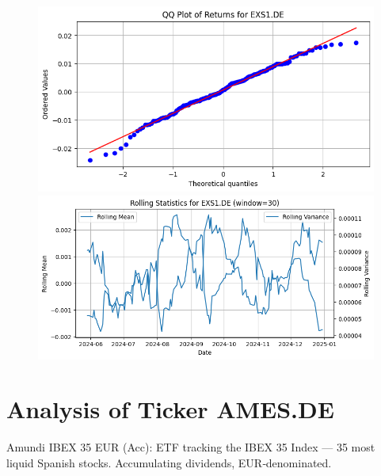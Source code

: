 \documentclass{article}%
\begin{document}
%


\begin{figure}[htbp]%
\begin{minipage}{0.48\textwidth}%
\includegraphics[width=\linewidth]{ticker_images/EXS1.DE_qq_plot.png}%
\end{minipage}%
\begin{minipage}{0.48\textwidth}%
\includegraphics[width=\linewidth]{ticker_images/EXS1.DE_rolling_stats.png}%
\end{minipage}%
\end{figure}

%
\section*{Analysis of Ticker AMES.DE}%
\label{sec:AnalysisofTickerAMES.DE}%
Amundi IBEX 35 EUR (Acc): ETF tracking the IBEX 35 Index — 35 most liquid Spanish stocks. Accumulating dividends, EUR‑denominated.%
\end{document}
